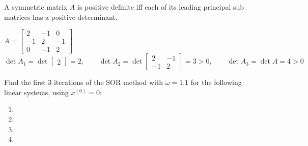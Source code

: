 \documentclass[../main-sheet.tex]{subfiles}
\begin{document}
\begin{thm}
    A symmetric matrix \(A\) is positive definite iff each of its leading principal sub matrices has a positive determinant.
\end{thm}
\begin{ex}
    \(A=\begin{bmatrix}
        2 & -1 &0\\
        -1 & 2 &-1\\
        0 & -1 &2
    \end{bmatrix}\)
    \[
        \det A_1=\det \begin{bmatrix}
            2
        \end{bmatrix}=2,\qquad \det A_2=\det \begin{bmatrix}
            2&-1\\
            -1&2
        \end{bmatrix}=3>0,\qquad \det A_3=\det A=4>0
    \]
\end{ex}
\begin{prob}[H.W.]
    Find the first 3 iterations of the SOR method with \(\omega=1.1\) for the following linear systems, using \(x^{(0)}=0\):
    \begin{enumerate}[label=(\roman*)]
        \item {}
        \item {}
            \item {}
            \item {}
    \end{enumerate}
\end{prob}
\end{document}
